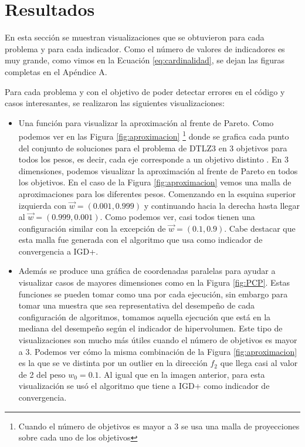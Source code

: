 \section{Resultados} \label{sec:Resultados}

En esta sección se muestran visualizaciones que se obtuvieron para cada problema y para cada indicador. Como el número de valores de indicadores es muy grande, como vimos en la Ecuación \ref{eq:cardinalidad}, se dejan las figuras completas en el Apéndice A.

Para cada problema y con el objetivo de poder detectar errores en el código y casos interesantes, se realizaron las siguientes visualizaciones:

\begin{itemize}
    \item Una función para visualizar la aproximación al frente de Pareto. Como podemos ver en las Figura \ref{fig:aproximacion} \footnote{Cuando el número de objetivos es mayor a 3 se usa una malla de proyecciones sobre cada uno de los objetivos} donde se grafica cada punto del conjunto de soluciones para el problema de DTLZ3 en 3 objetivos para todos los pesos, es decir, cada eje corresponde a un objetivo distinto . En 3 dimensiones, podemos visualizar la aproximación al frente de Pareto en todos los objetivos. En el caso de la Figura \ref{fig:aproximacion} vemos una malla de aproximaciones para los diferentes pesos. Comenzando en la esquina superior izquierda con $\vec{w}=(0.001,0.999)$ y continuando hacia la derecha hasta llegar al $\vec{w}=(0.999,0.001)$. Como podemos ver, casi todos tienen una configuración similar con la excepción de $\vec{w}=(0.1,0.9)$. Cabe destacar que esta malla fue generada con el algoritmo que usa como indicador de convergencia a IGD+.
    \item Además se produce una gráfica de coordenadas paralelas para ayudar a visualizar casos de mayores dimensiones como en la Figura \ref{fig:PCP}. Estas funciones se pueden tomar como una por cada ejecución, sin embargo para tomar una muestra que sea representativa del desempeño de cada configuración de algoritmos, tomamos aquella ejecución que está en la mediana del desempeño según el indicador de hipervolumen. Este tipo de visualizaciones son mucho más útiles cuando el número de objetivos es mayor a 3. Podemos ver cómo la misma combinación de la Figura \ref{fig:aproximacion} es la que se ve distinta por un outlier en la dirección $f_2$ que llega casi al valor de 2 del peso $w_0=0.1$. Al igual que en la imagen anterior, para esta visualización se usó el algoritmo que tiene a IGD+ como indicador de convergencia.

\end{itemize}
